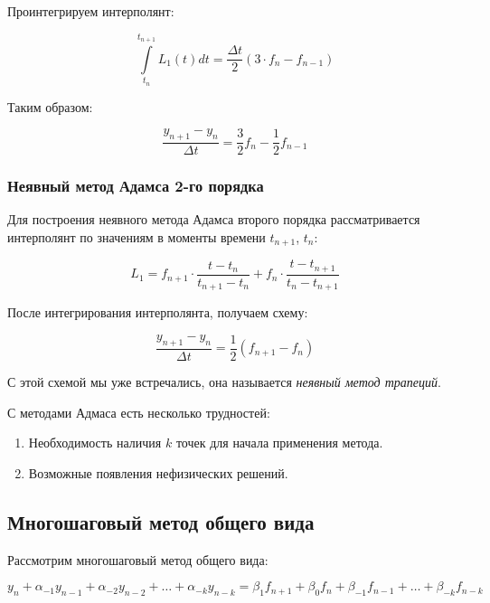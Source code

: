 \documentclass[10pt,a4paper]{article}
\begin{document}
		Проинтегрируем интерполянт:
		
		\begin{equation}
			\int\limits_{t_{n}}^{t_{n + 1}}L_{1}\left(t\right)dt = 
			\frac{\Delta t}{2}\left(3\cdot f_{n} - f_{n - 1}\right)
		\end{equation}
		
		Таким образом:
		
		\begin{equation}
			\frac{y_{n + 1} - y_{n}}{\Delta t} = \frac{3}{2}f_{n} - \frac{1}{2}
			f_{n - 1}
		\end{equation}
		
	\subsubsection{Неявный метод Адамса 2-го порядка}
	
		Для построения неявного метода Адамса второго порядка рассматривается 
		интерполянт по значениям в моменты времени $t_{n+1}$, $t_n$:
		
		\begin{equation}
			L_{1} = f_{n + 1}\cdot\frac{t - t_{n}}{t_{n + 1} - t_{n}} + 
			f_{n}\cdot\frac{t - t_{n + 1}}{t_{n} - t_{n + 1}}
		\end{equation}
		
		После интегрирования интерполянта, получаем схему:
		
		\begin{equation}
			\frac{y_{n + 1} - y_{n}}{\Delta t} = \frac{1}{2}\left(
			f_{n + 1} - f_{n}\right)
		\end{equation}
		
		С этой схемой мы уже встречались, она называется \textit{неявный метод 
		трапеций}.
		
	С методами Адмаса есть несколько трудностей:
	
	\begin{enumerate}
		\item Необходимость наличия $k$ точек для начала применения метода.
		\item Возможные появления нефизических решений.
	\end{enumerate}
	
	\subsection{Многошаговый метод общего вида}
		Рассмотрим многошаговый метод общего вида:

		\begin{equation}
			y_{n} + \alpha_{-1}y_{n - 1} + \alpha_{-2}y_{n - 2} + \ldots + 
			\alpha_{-k}y_{n - k} = \beta_{1}f_{n + 1} + \beta_{0}f_{n} + 
			\beta_{-1}f_{n - 1} + \ldots + \beta_{-k}f_{n - k}
		\end{equation}
		
\end{document}

